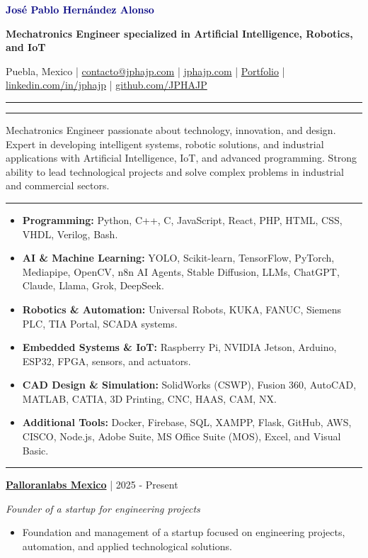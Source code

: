 \documentclass[10pt,letterpaper]{article}
\newcommand{\sectionline}{\vspace{-2pt}\textcolor{accent}{\rule{\linewidth}{0.8pt}}\vspace{1pt}}
\newcommand{\cvsection}[1]{\vspace{5pt}{\large\bfseries\textcolor{navy}{#1}}\par\sectionline}
\newcommand{\entry}[3]{\textbf{#1} \textcolor{muted}{| #2}\par\textit{#3}\par}
\begin{document}
\color{text}

{\Huge\bfseries\textcolor{navy}{Jos\'{e} Pablo Hern\'{a}ndez Alonso}}\par
{\large\bfseries Mechatronics Engineer specialized in Artificial Intelligence, Robotics, and IoT}\par
\vspace{2pt}
Puebla, Mexico \; | \; \href{mailto:contacto@jphajp.com}{contacto@jphajp.com} \; | \; \href{https://jphajp.com/}{jphajp.com} \; | \; \href{https://jphajp.github.io/JPHAJP/}{Portfolio} \; | \; \href{https://www.linkedin.com/in/jphajp}{linkedin.com/in/jphajp} \; | \; \href{https://github.com/JPHAJP}{github.com/JPHAJP}
\par\vspace{3pt}\textcolor{accent}{\rule{\linewidth}{1.8pt}}

\cvsection{Professional Profile}
Mechatronics Engineer passionate about technology, innovation, and design. Expert in developing intelligent systems, robotic solutions, and industrial applications with Artificial Intelligence, IoT, and advanced programming. Strong ability to lead technological projects and solve complex problems in industrial and commercial sectors.

\cvsection{Technical Skills}
\begin{itemize}
  \item \textbf{Programming:} Python, C++, C, JavaScript, React, PHP, HTML, CSS, VHDL, Verilog, Bash.
  \item \textbf{AI \& Machine Learning:} YOLO, Scikit-learn, TensorFlow, PyTorch, Mediapipe, OpenCV, n8n AI Agents, Stable Diffusion, LLMs, ChatGPT, Claude, Llama, Grok, DeepSeek.
  \item \textbf{Robotics \& Automation:} Universal Robots, KUKA, FANUC, Siemens PLC, TIA Portal, SCADA systems.
  \item \textbf{Embedded Systems \& IoT:} Raspberry Pi, NVIDIA Jetson, Arduino, ESP32, FPGA, sensors, and actuators.
  \item \textbf{CAD Design \& Simulation:} SolidWorks (CSWP), Fusion 360, AutoCAD, MATLAB, CATIA, 3D Printing, CNC, HAAS, CAM, NX.
  \item \textbf{Additional Tools:} Docker, Firebase, SQL, XAMPP, Flask, GitHub, AWS, CISCO, Node.js, Adobe Suite, MS Office Suite (MOS), Excel, and Visual Basic.
\end{itemize}

\cvsection{Professional Experience}
\entry{\href{https://www.palloranlabs.com/}{Palloranlabs Mexico}}{2025 - Present}{Founder of a startup for engineering projects}
\begin{itemize}
  \item Foundation and management of a startup focused on engineering projects, automation, and applied technological solutions.
\end{itemize}
\end{document}
